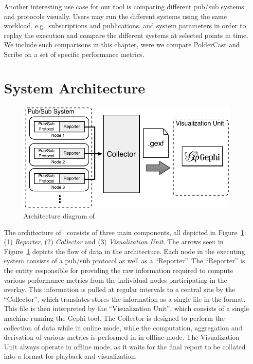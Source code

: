 Another interesting use case for our tool is comparing different pub/sub systems and
protocols visually. Users may run the different systems using the same
workload, e.g.\ subscriptions and publications, and system parameters in
order to replay the execution and compare the different systems at
selected points in time. We include such comparisons in this chapter,
were we compare PolderCast and Scribe on a set of specific performance
metrics.

\section{System Architecture}
\label{sec:arch}

\begin{figure}[h]
\centering
\includegraphics[width=\linewidth]{figures/arch}
\caption{Architecture diagram of \demo}
\label{fig:arch}
\end{figure}

The architecture of \demo~consists of three main components, all
depicted in Figure~\ref{fig:arch}: (1) \emph{Reporter}, (2)
\emph{Collector} and (3) \emph{Visualization Unit}.  The arrows seen in
Figure~\ref{fig:arch} depicts the flow of data in the architecture.
Each node in the executing system consists of a pub/sub protocol as well
as a ``Reporter''. The ``Reporter'' is the entity responsible for
providing the raw information required to compute various performance
metrics from the individual nodes participating in the overlay. This
information is pulled at regular intervals to a central site by the
``Collector'', which translates stores the information as a single
file in the \gexf{} format. This file is then interpreted by the
``Visualization Unit'', which consists of a single machine running
the Gephi tool. The Collector is designed to perform the collection of
data while in online mode, while the computation, aggregation and
derivation of various metrics is performed in in offline mode. The
Visualization Unit always operate in offline mode, as it waits for the
final report to be collated into a \gexf{} format for playback and
visualization.

